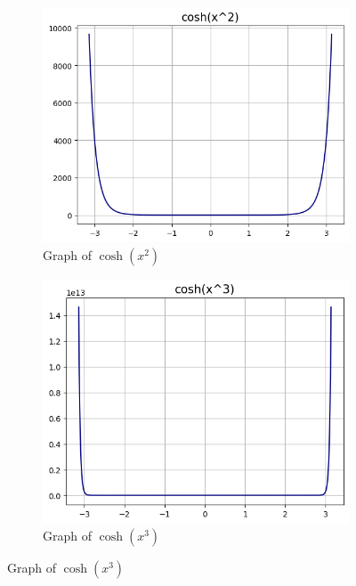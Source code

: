 \documentclass{article}
\begin{document}
\begin{figure}[h!]
\begin{subfigure}[t]{0.3\textwidth}
            \includegraphics[width=\textwidth]{params/cosh-x2.png}
            \caption{Graph of $\cosh(x^2)$}
            \label{fig:cosh-x2}
        \end{subfigure}       
        \hfill
        \begin{subfigure}[t]{0.3\textwidth}
            \includegraphics[width=\textwidth]{params/cosh-x3.png}
            \caption{Graph of $\cosh(x^3)$}
            \label{fig:cosh-x3}
        \end{subfigure}
    \end{figure}

    
\end{document}
